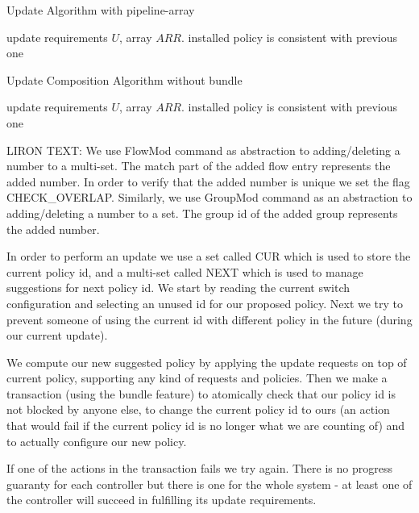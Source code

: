 \documentclass[conference]{sigcomm-alternate}
\begin{document}
\begin{algorithm}[t]
    \caption{Update Algorithm with pipeline-array}
    \label{alg:template}
    \begin{algorithmic}[1]
    \Require update requirements $U$, array $ARR$.
    \Ensure installed policy is consistent with previous one
			\Return

    \end{algorithmic}
\end{algorithm}

\begin{algorithm}[t]
    \caption{Update Composition Algorithm without bundle}
    \label{alg:template}
    \begin{algorithmic}[1]
    \Require update requirements $U$, array $ARR$.
    \Ensure installed policy is consistent with previous one
			\Return

    \end{algorithmic}
\end{algorithm}

LIRON TEXT: We use FlowMod command as abstraction to adding/deleting a number to a multi-set. The match part of the added flow entry represents the added number. In order to verify that the added number is unique we set the flag CHECK\_OVERLAP. Similarly, we use GroupMod command as an abstraction to adding/deleting a number to a set. The group id of the added group represents the added number.

In order to perform an update we use a set called CUR which is used to store the current policy id, and a multi-set called NEXT which is used to manage suggestions for next policy id. We start by reading the current switch configuration and selecting an unused id for our proposed policy. Next we try to prevent someone of using the current id with different policy in the future (during our current update).

We compute our new suggested policy by applying the update requests on top of current policy, supporting any kind of requests and policies. Then we make a transaction (using the bundle feature) to atomically check that our policy id is not blocked by anyone else, to change the current policy id to ours (an action that would fail if the current policy id is no longer what we are counting of) and to actually configure our new policy.

If one of the actions in the transaction fails we try again. There is no progress guaranty for each controller but there is one for the whole system - at least one of the controller will succeed in fulfilling its update requirements.
\end{document}
